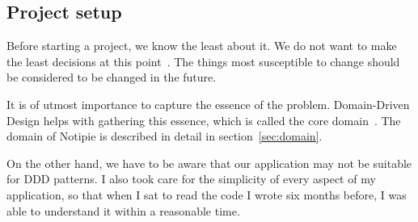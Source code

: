 \subsection{Project setup}\label{sec:project-setup}

Before starting a project,
we know the least about it.
We do not want to make the least decisions
at this point~\cite{beck_extreme_2004}.
The things most susceptible to change
should be considered to be changed in the future.

It is of utmost importance to capture
the essence of the problem.
Domain-Driven Design helps with
gathering this essence,
which is called
the core domain~\cite[Part~I, Chapter~3]{millett_patterns_2015}.
The domain of Notipie is described in detail
in section~\ref{sec:domain}.

On the other hand,
we have to be aware that our application
may not be suitable for DDD patterns.
I also took care for the simplicity
of every aspect of my application,
so that when I sat to read the code
I wrote six months before,
I was able to understand it
within a reasonable time.
